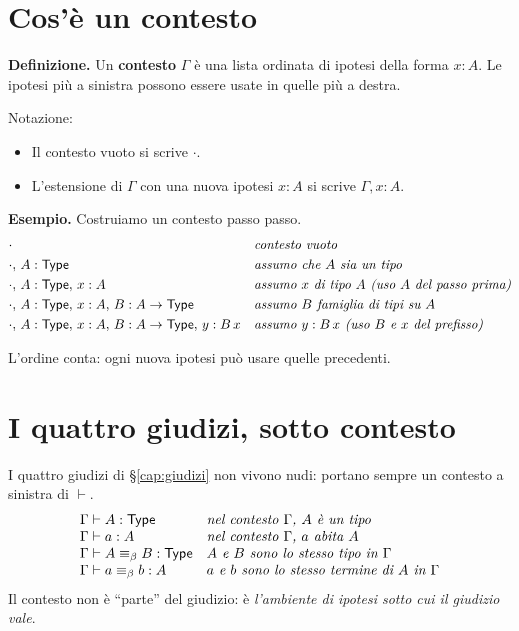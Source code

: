 \section*{Cos'\`e un contesto}

\noindent\textbf{Definizione.} Un \textbf{contesto} $\Gamma$ \`e una lista ordinata di ipotesi della forma $x : A$. Le ipotesi pi\`u a sinistra possono essere usate in quelle pi\`u a destra.

\bigskip

\noindent Notazione:
\begin{itemize}
\item Il contesto vuoto si scrive $\cdot$.
\item L'estensione di $\Gamma$ con una nuova ipotesi $x : A$ si scrive $\Gamma, x : A$.
\end{itemize}

\bigskip

\noindent\textbf{Esempio.} Costruiamo un contesto passo passo.
\begin{align*}
&\cdot && \text{\textit{contesto vuoto}} \\
&\cdot,\, A : \mathsf{Type} && \text{\textit{assumo che $A$ sia un tipo}} \\
&\cdot,\, A : \mathsf{Type},\, x : A && \text{\textit{assumo $x$ di tipo $A$ (uso $A$ del passo prima)}} \\
&\cdot,\, A : \mathsf{Type},\, x : A,\, B : A \to \mathsf{Type} && \text{\textit{assumo $B$ famiglia di tipi su $A$}} \\
&\cdot,\, A : \mathsf{Type},\, x : A,\, B : A \to \mathsf{Type},\, y : B\,x && \text{\textit{assumo $y : B\,x$ (uso $B$ e $x$ del prefisso)}}
\end{align*}

\noindent L'ordine conta: ogni nuova ipotesi pu\`o usare quelle precedenti.

\section*{I quattro giudizi, sotto contesto}

I quattro giudizi di \S\ref{cap:giudizi} non vivono nudi: portano sempre un contesto a sinistra di $\vdash$.
\begin{equation*}
\begin{array}{ll}
\Gamma \vdash A : \mathsf{Type} & \text{\textit{nel contesto $\Gamma$, $A$ \`e un tipo}} \\
\Gamma \vdash a : A & \text{\textit{nel contesto $\Gamma$, $a$ abita $A$}} \\
\Gamma \vdash A \equiv_{\beta} B : \mathsf{Type} & \text{\textit{$A$ e $B$ sono lo stesso tipo in $\Gamma$}} \\
\Gamma \vdash a \equiv_{\beta} b : A & \text{\textit{$a$ e $b$ sono lo stesso termine di $A$ in $\Gamma$}}
\end{array}
\end{equation*}
\noindent Il contesto non \`e ``parte'' del giudizio: \`e \emph{l'ambiente di ipotesi sotto cui il giudizio vale}.

